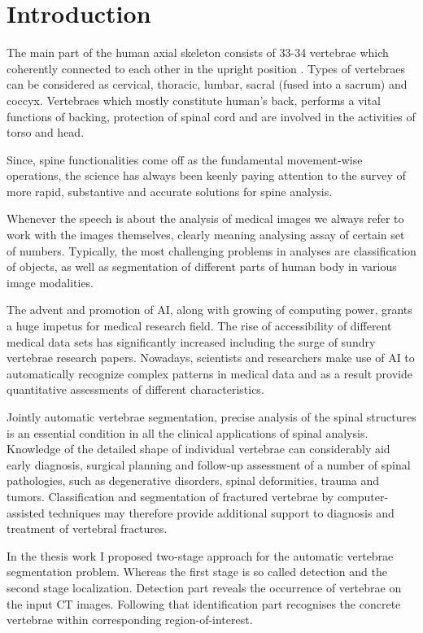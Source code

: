 \chapter{Introduction}
\label{ch:introduction}


The main part of the human axial skeleton consists of 33-34 vertebrae which coherently connected to each other in the upright position \cite{Ahlberg2005}. Types of vertebraes can be considered as cervical, thoracic, lumbar, sacral (fused into a sacrum) and coccyx. Vertebraes which mostly constitute human's back, performs a vital functions of backing, protection of spinal cord and are involved in the activities of torso and head.

Since, spine functionalities come off as the fundamental movement-wise operations, the science has always been keenly paying attention to the survey of more rapid, substantive and accurate solutions for spine analysis.
 
Whenever the speech is about the analysis of medical images we always refer to work with the images themselves, clearly meaning analysing assay of certain set of numbers. Typically, the most challenging problems in analyses are classification of objects, as well as segmentation of different parts of human body in various image modalities.  
 
The advent and promotion of AI, along with growing of computing power, \cite{Pham2000} grants a huge impetus for medical research field. The rise of accessibility of different medical data sets has significantly increased including the surge of sundry vertebrae research papers. Nowadays, scientists and researchers make use of AI to automatically recognize complex patterns in medical data and as a result provide quantitative assessments of different characteristics.  
 
Jointly automatic vertebrae segmentation, precise analysis of the spinal structures is an essential condition in all the clinical applications of spinal analysis. Knowledge of the detailed shape of individual vertebrae can considerably aid early diagnosis, surgical planning and follow-up assessment of a number of spinal pathologies, such as degenerative disorders, spinal deformities, trauma and tumors. Classification and segmentation of fractured vertebrae by computer-assisted techniques may therefore provide additional support to diagnosis and treatment of vertebral fractures. 

In the thesis work I proposed two-stage approach for the automatic vertebrae segmentation problem. Whereas the first stage is so called detection and the second stage localization. 
Detection part reveals the occurrence of vertebrae on the input CT images. Following that identification part recognises the concrete vertebrae within corresponding region-of-interest.